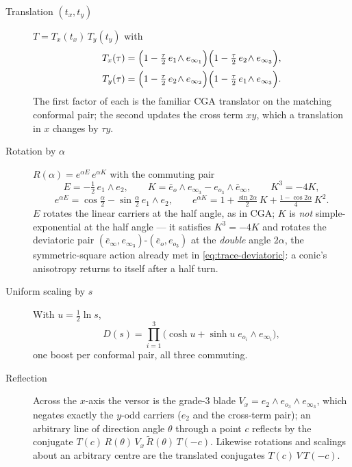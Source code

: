 \documentclass{birkjour}
\theoremstyle{definition}
\theoremstyle{remark}
\newcommand{\eobar}{\bar e_o}
\newcommand{\einfbar}{\bar e_\infty}
\newcommand{\joinp}{\wedge}
\begin{document}
\begin{description}
\item[Translation $(t_x,t_y)$] $T = T_x(t_x)\,T_y(t_y)$ with
\begin{align}
  T_x(\tau)&=\Big(1-\tfrac{\tau}2\, e_1\!\joinp e_{\infty_1}\Big)
             \Big(1-\tfrac{\tau}2\, e_2\!\joinp e_{\infty_3}\Big),
  \label{eq:translator}\\
  T_y(\tau)&=\Big(1-\tfrac{\tau}2\, e_2\!\joinp e_{\infty_2}\Big)
             \Big(1-\tfrac{\tau}2\, e_1\!\joinp e_{\infty_3}\Big).\notag
\end{align}
The first factor of each is the familiar CGA translator on the matching
conformal pair; the second updates the cross term $xy$, which a translation
in $x$ changes by $\tau y$.
\item[Rotation by $\alpha$] $R(\alpha) = e^{\alpha E}\, e^{\alpha K}$ with
the commuting pair
\begin{equation}\label{eq:rotor}
  E=-\tfrac12\, e_1\joinp e_2, \qquad
  K=\eobar\joinp e_{\infty_3} - e_{o_3}\joinp\einfbar,
  \qquad K^3 = -4K,
\end{equation}
\begin{equation}\label{eq:rotor-exp}
  e^{\alpha E} = \cos\tfrac{\alpha}{2} - \sin\tfrac{\alpha}{2}\, e_1\joinp e_2,
  \qquad
  e^{\alpha K} = 1 + \tfrac{\sin 2\alpha}{2}\,K + \tfrac{1-\cos2\alpha}{4}\,K^2 .
\end{equation}
$E$ rotates the linear carriers at the half angle, as in CGA; $K$ is
\emph{not} simple-exponential at the half angle --- it satisfies $K^3=-4K$
and rotates the deviatoric pair $(\einfbar, e_{\infty_3})$-$(\eobar,e_{o_3})$
at the \emph{double} angle $2\alpha$, the symmetric-square action already met
in \cref{eq:trace-deviatoric}: a conic's anisotropy returns to itself after a
half turn.
\item[Uniform scaling by $s$] With $u=\tfrac12\ln s$,
\begin{equation}\label{eq:dilator}
  D(s)=\prod_{i=1}^{3}\big(\cosh u + \sinh u \; e_{o_i}\!\joinp e_{\infty_i}\big),
\end{equation}
one boost per conformal pair, all three commuting.
\item[Reflection] Across the $x$-axis the versor is the grade-$3$ blade
$V_x = e_2\joinp e_{o_3}\joinp e_{\infty_3}$, which negates exactly the
$y$-odd carriers ($e_2$ and the cross-term pair); an arbitrary line of
direction angle $\theta$ through a point $c$ reflects by the conjugate
$T(c)\,R(\theta)\,V_x\,\tilde R(\theta)\,T(-c)$. Likewise rotations and
scalings about an arbitrary centre are the translated conjugates
$T(c)\,V\,T(-c)$.
\end{description}
\end{document}
